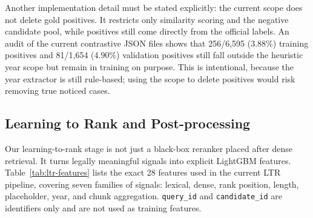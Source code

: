 Another implementation detail must be stated explicitly: the current scope does not delete gold positives. It restricts only similarity scoring and the negative candidate pool, while positives still come directly from the official labels. An audit of the current contrastive JSON files shows that 256/6,595 (3.88\%) training positives and 81/1,654 (4.90\%) validation positives still fall outside the heuristic year scope but remain in training on purpose. This is intentional, because the year extractor is still rule-based; using the scope to delete positives would risk removing true noticed cases.

\subsection{Learning to Rank and Post-processing}

Our learning-to-rank stage is not just a black-box reranker placed after dense retrieval. It turns legally meaningful signals into explicit LightGBM features. Table~\ref{tab:ltr-features} lists the exact 28 features used in the current LTR pipeline, covering seven families of signals: lexical, dense, rank position, length, placeholder, year, and chunk aggregation. \texttt{query\_id} and \texttt{candidate\_id} are identifiers only and are not used as training features.

